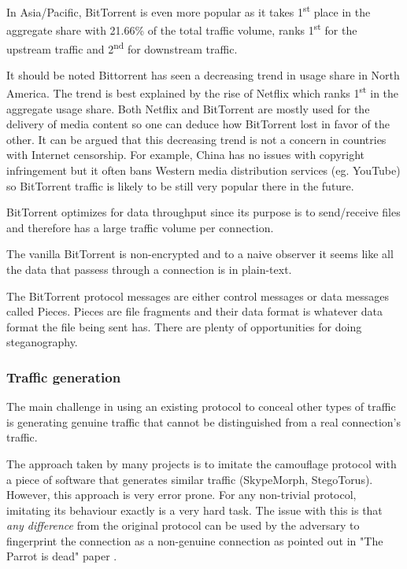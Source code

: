 \documentclass[11pt]{article} %
\begin{document}
In Asia/Pacific, BitTorrent is even more popular as it takes 1\textsuperscript{st} place in the aggregate share with 21.66\% of the total traffic volume, ranks  1\textsuperscript{st} for the upstream traffic and  2\textsuperscript{nd} for downstream traffic.

It should be noted Bittorrent has seen a decreasing trend in usage share in North America. The trend is best explained by the rise of Netflix which ranks 1\textsuperscript{st} in the aggregate usage share. Both Netflix and BitTorrent are mostly used for the delivery of media content so one can deduce how BitTorrent lost in favor of the other. It can be argued that this decreasing trend is not a concern in countries with Internet censorship. For example, China has no issues with copyright infringement but it often bans Western media distribution services (eg. YouTube) so BitTorrent traffic is likely to be still very popular there in the future.

BitTorrent optimizes for data throughput since its purpose is to send/receive files and therefore has a large traffic volume per connection.

The vanilla BitTorrent is non-encrypted and to a naive observer it seems like all the data that passess through a connection is in plain-text.

The BitTorrent protocol messages are either control messages or data messages called Pieces. Pieces are file fragments and their data format is whatever data format the file being sent has. There are plenty of opportunities for doing steganography.


\subsubsection{Traffic generation}

The main challenge in using an existing protocol to conceal other types of traffic is generating genuine traffic that cannot be distinguished from a real connection's traffic.

The approach taken by many projects is to imitate the camouflage protocol with a piece of software that generates similar traffic (SkypeMorph, StegoTorus). However, this approach is very error prone. For any non-trivial protocol, imitating its behaviour exactly is a very hard task. The issue with this is that \textit{any difference} from the original protocol can be used by the adversary to fingerprint the connection as a non-genuine connection as pointed out in "The Parrot is dead" paper  \citep*{deadParrot}.
\end{document}

